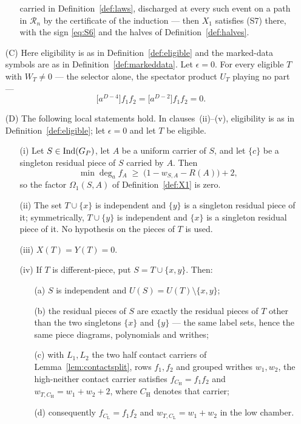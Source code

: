 \begin{theorem}
\begin{enumerate}
\begin{enumerate}
carried in Definition~\ref{def:laws}, discharged at every such event on a
path in $\mathcal R_n$ by the certificate of the induction --- then $X_1$
satisfies (S7) there, with the sign \eqref{eq:S6} and the halves of
Definition~\ref{def:halves}.
\end{enumerate}
\item[(C)] Here eligibility is as in Definition~\ref{def:eligible} and the marked-data symbols are
as in Definition~\ref{def:markeddata}.
Let $\epsilon=0$. For every eligible $T$ with $W_T\neq0$ --- the selector alone,
the spectator product $U_T$ playing no part ---
\[
   \bigl[a^{D-4}\bigr]f_1f_2=\bigl[a^{D-2}\bigr]f_1f_2=0 .
\]
\item[(D)] The following local statements hold. In clauses~(ii)--(v),
eligibility is as in Definition~\ref{def:eligible}; let $\epsilon=0$ and let
$T$ be eligible.
\begin{enumerate}
\item[(i)] Let $S\in\operatorname{Ind}(G_P)$, let $A$ be a uniform carrier of $S$, and let $\{c\}$ be a
singleton residual piece of $S$ carried by $A$. Then
\[
   \min\deg_af_A\;\geq\;\bigl(1-w_{S,A}-R(A)\bigr)+2,
\]
so the factor $\Omega_1(S,A)$ of Definition~\ref{def:X1} is zero.
\item[(ii)] The set $T\cup\{x\}$ is independent and $\{y\}$ is a singleton
residual piece of it; symmetrically, $T\cup\{y\}$ is independent and $\{x\}$
is a singleton residual piece of it. No hypothesis on the pieces of $T$ is
used.
\item[(iii)] $X(T)=Y(T)=0$.
\item[(iv)] If $T$ is different-piece, put $S=T\cup\{x,y\}$. Then:
\begin{enumerate}
\item[(a)] $S$ is independent and $U(S)=U(T)\setminus\{x,y\}$;
\item[(b)] the residual pieces of $S$ are exactly the residual pieces of $T$
other than the two singletons $\{x\}$ and $\{y\}$ --- the same label sets, hence
the same piece diagrams, polynomials and writhes;
\item[(c)] with $L_1,L_2$ the two half contact carriers of
Lemma~\ref{lem:contactsplit}, rows $f_1,f_2$ and grouped writhes $w_1,w_2$, the
high-neither contact carrier satisfies $f_{C_{\mathrm H}}=f_1f_2$ and
$w_{T,C_{\mathrm H}}=w_1+w_2+2$, where $C_{\mathrm H}$ denotes that carrier;
\item[(d)] consequently $f_{C_{\mathrm L}}=f_1f_2$ and $w_{T,C_{\mathrm L}}=w_1+w_2$ in the low
chamber.
\end{enumerate}

\end{enumerate}
\end{enumerate}
\end{theorem}
